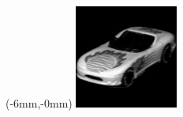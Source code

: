 \documentclass[a4paper,12pt]{article}
\begin{document}
\begin{titlepage}
\begin{textblock*}{297mm}(-6mm,-0mm)
\includegraphics[width=\paperwidth]
{frontpages/obj6__60.png}\end{textblock*} \
\end{titlepage}
\setlength{\columnseprule}{0.5pt}
\begin{multicols}{2}
\tableofcontents
\end{multicols}
\pagebreak
\end{document}
